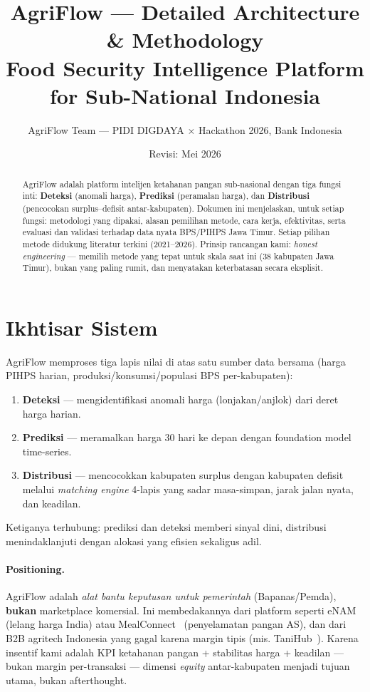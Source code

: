 \documentclass[11pt,a4paper]{article}
\title{\textbf{AgriFlow --- Detailed Architecture \& Methodology}\\[2pt]
\large Food Security Intelligence Platform for Sub-National Indonesia}
\author{AgriFlow Team --- PIDI DIGDAYA $\times$ Hackathon 2026, Bank Indonesia}
\date{Revisi: Mei 2026}
\begin{document}
\maketitle

\begin{abstract}
\noindent
AgriFlow adalah platform intelijen ketahanan pangan sub-nasional dengan tiga fungsi inti:
\textbf{Deteksi} (anomali harga), \textbf{Prediksi} (peramalan harga), dan \textbf{Distribusi}
(pencocokan surplus--defisit antar-kabupaten). Dokumen ini menjelaskan, untuk setiap fungsi:
metodologi yang dipakai, alasan pemilihan metode, cara kerja, efektivitas, serta evaluasi dan
validasi terhadap data nyata BPS/PIHPS Jawa Timur. Setiap pilihan metode didukung literatur
terkini (2021--2026). Prinsip rancangan kami: \emph{honest engineering} --- memilih metode yang
tepat untuk skala saat ini (38 kabupaten Jawa Timur), bukan yang paling rumit, dan menyatakan
keterbatasan secara eksplisit.
\end{abstract}

\section{Ikhtisar Sistem}
AgriFlow memproses tiga lapis nilai di atas satu sumber data bersama (harga PIHPS harian,
produksi/konsumsi/populasi BPS per-kabupaten):
\begin{enumerate}
  \item \textbf{Deteksi} --- mengidentifikasi anomali harga (lonjakan/anjlok) dari deret harga harian.
  \item \textbf{Prediksi} --- meramalkan harga 30 hari ke depan dengan foundation model time-series.
  \item \textbf{Distribusi} --- mencocokkan kabupaten surplus dengan kabupaten defisit melalui
        \emph{matching engine} 4-lapis yang sadar masa-simpan, jarak jalan nyata, dan keadilan.
\end{enumerate}
Ketiganya terhubung: prediksi dan deteksi memberi sinyal dini, distribusi menindaklanjuti dengan
alokasi yang efisien sekaligus adil.

\paragraph{Positioning.} AgriFlow adalah \emph{alat bantu keputusan untuk pemerintah}
(Bapanas/Pemda), \textbf{bukan} marketplace komersial. Ini membedakannya dari platform seperti
eNAM~\cite{enam} (lelang harga India) atau MealConnect~\cite{mealconnect} (penyelamatan pangan AS),
dan dari B2B agritech Indonesia yang gagal karena margin tipis (mis. TaniHub~\cite{tanihub}). Karena
insentif kami adalah KPI ketahanan pangan + stabilitas harga + keadilan --- bukan margin per-transaksi
--- dimensi \emph{equity} antar-kabupaten menjadi tujuan utama, bukan afterthought.
\end{document}
